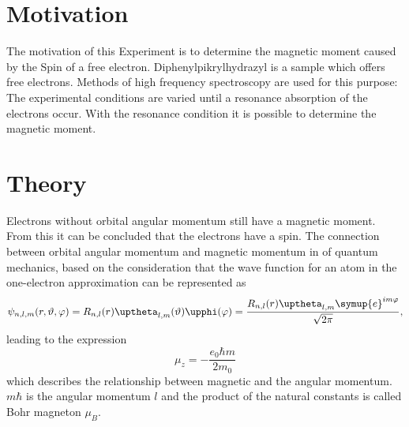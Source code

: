 \section{Motivation}
The motivation of this Experiment is to determine the magnetic moment caused by the Spin of a free electron.
Diphenylpikrylhydrazyl is a sample which offers free electrons. Methods of high frequency spectroscopy are used for this purpose:
The experimental conditions are varied until a resonance absorption of the electrons occur. With the resonance condition it is possible
to determine the magnetic moment.
\section{Theory}
Electrons without orbital angular momentum still have a magnetic moment.
From this it can be concluded that the electrons have a spin. The connection between orbital
angular momentum and magnetic momentum in
of quantum mechanics, based on the consideration that the
wave function for an atom in the one-electron approximation can be represented as
\begin{equation}
  \psi_{n,l,m}(r,\vartheta,\varphi)=R_{n,l}(r)\uptheta_{l,m}(\vartheta)\upphi(\varphi)=\frac{R_{n,l}(r)\uptheta_{l,m}\symup{e}^{im\varphi}}{\sqrt{2\pi}},
\end{equation}
leading to the expression
\begin{equation}
  \mu_z=-\frac{e_0\hbar m}{2m_0}
\end{equation}
which describes the relationship between magnetic
and the angular momentum. $m\hbar$ is the angular momentum $l$ and the product of the natural constants is called Bohr magneton $\mu_B$.
